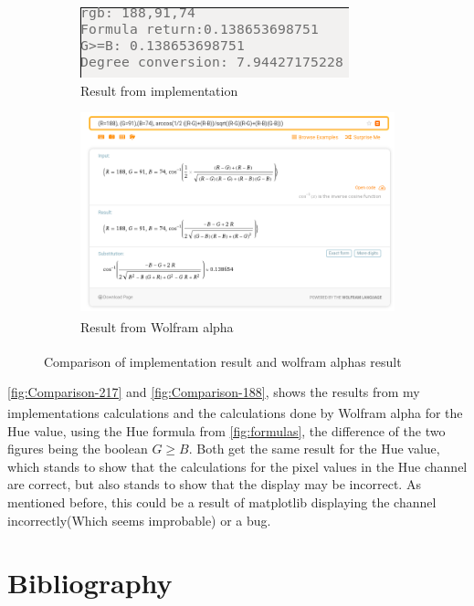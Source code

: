 \documentclass{article}
\newcommand{\goodcite}[1]{\textsuperscript{\cite{#1}}}
\begin{document}
\begin{figure}[H]
\centering
\begin{subfigure}{.5\textwidth}
  \centering
  \includegraphics[width=0.9\linewidth]{img/rgb-188-91-74-code.png}
    \caption{Result from implementation}
  \label{fig:188_code}
\end{subfigure}%
    \begin{subfigure}{.5\textwidth}
  \centering
  \includegraphics[width=0.9\linewidth]{img/rgb-188-91-74-wolfram.png}
    \caption{Result from Wolfram alpha\goodcite{Wolfram}}
  \label{fig:188_wolfram}
\end{subfigure}
    \caption{Comparison of implementation result and wolfram alphas\goodcite{Wolfram} result}
\label{fig:Comparison-188}
\end{figure}

\autoref{fig:Comparison-217} and \autoref{fig:Comparison-188}, shows the results from my implementations calculations and the calculations done by Wolfram alpha\goodcite{Wolfram} for the Hue value, using the Hue formula from \autoref{fig:formulas}, the difference of the two figures being the boolean $G \ge B$. Both get the same result for the Hue value, which stands to show that the calculations for the pixel values in the Hue channel are correct, but also stands to show that the display may be incorrect. As mentioned before, this could be a result of matplotlib displaying the channel incorrectly(Which seems improbable) or a bug.

\newpage
\section{Bibliography}
\printbibliography
\end{document}
